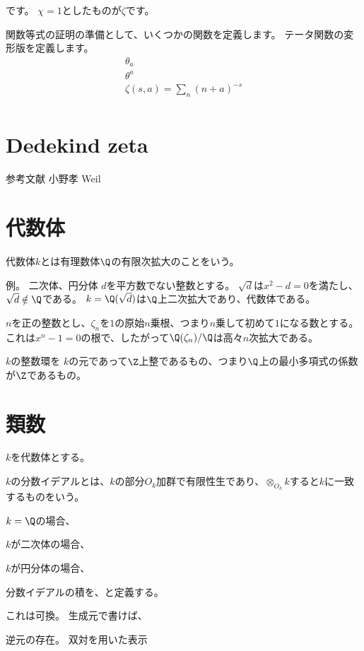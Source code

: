 \documentclass[uplatex, a4paper]{jsbook}
\begin{document}
です。
$\chi=1$としたものが$\zeta$です。

関数等式の証明の準備として、いくつかの関数を定義します。
テータ関数の変形版を定義します。
\begin{align*}
\theta_a\\
\theta^a\\
\zeta(s,a)=\sum_n(n+a)^{-s}\\
\end{align*}

\section{Dedekind zeta}
参考文献
小野孝
Weil

\section{代数体}
代数体$k$とは有理数体$\Q$の有限次拡大のことをいう。

例。
二次体、円分体
$d$を平方数でない整数とする。
$\sqrt{d}$は$x^2-d=0$を満たし、$\sqrt{d}\notin\Q$である。
$k=\Q(\sqrt{d})$は$\Q$上二次拡大であり、代数体である。

$n$を正の整数とし、$\zeta_n$を$1$の原始$n$乗根、つまり$n$乗して初めて$1$になる数とする。
これは$x^n-1=0$の根で、したがって$\Q(\zeta_n)/\Q$は高々$n$次拡大である。

$k$の整数環を
$k$の元であって$\Z$上整であるもの、つまり$\Q$上の最小多項式の係数が$\Z$であるもの。

\section{類数}
$k$を代数体とする。

\begin{dfn}
$k$の分数イデアルとは、$k$の部分$O_k$加群で有限性生であり、$\otimes_{O_k}k$すると$k$に一致するものをいう。
\end{dfn}

\begin{eg}
$k=\Q$の場合、

$k$が二次体の場合、

$k$が円分体の場合、
\end{eg}

\begin{dfn}
分数イデアルの積を、と定義する。
\end{dfn}

これは可換。
生成元で書けば、

逆元の存在。
双対を用いた表示
\end{document}
